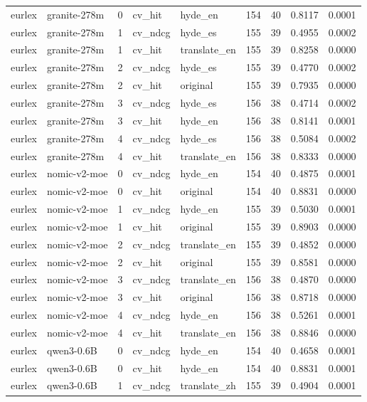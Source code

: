 \begin{tabular}{llrllrrrr}
eurlex & granite-278m & 0 & cv\_hit & hyde\_en & 154 & 40 & 0.8117 & 0.0001 \\
eurlex & granite-278m & 1 & cv\_ndcg & hyde\_es & 155 & 39 & 0.4955 & 0.0002 \\
eurlex & granite-278m & 1 & cv\_hit & translate\_en & 155 & 39 & 0.8258 & 0.0000 \\
eurlex & granite-278m & 2 & cv\_ndcg & hyde\_es & 155 & 39 & 0.4770 & 0.0002 \\
eurlex & granite-278m & 2 & cv\_hit & original & 155 & 39 & 0.7935 & 0.0000 \\
eurlex & granite-278m & 3 & cv\_ndcg & hyde\_es & 156 & 38 & 0.4714 & 0.0002 \\
eurlex & granite-278m & 3 & cv\_hit & hyde\_en & 156 & 38 & 0.8141 & 0.0001 \\
eurlex & granite-278m & 4 & cv\_ndcg & hyde\_es & 156 & 38 & 0.5084 & 0.0002 \\
eurlex & granite-278m & 4 & cv\_hit & translate\_en & 156 & 38 & 0.8333 & 0.0000 \\
eurlex & nomic-v2-moe & 0 & cv\_ndcg & hyde\_en & 154 & 40 & 0.4875 & 0.0001 \\
eurlex & nomic-v2-moe & 0 & cv\_hit & original & 154 & 40 & 0.8831 & 0.0000 \\
eurlex & nomic-v2-moe & 1 & cv\_ndcg & hyde\_en & 155 & 39 & 0.5030 & 0.0001 \\
eurlex & nomic-v2-moe & 1 & cv\_hit & original & 155 & 39 & 0.8903 & 0.0000 \\
eurlex & nomic-v2-moe & 2 & cv\_ndcg & translate\_en & 155 & 39 & 0.4852 & 0.0000 \\
eurlex & nomic-v2-moe & 2 & cv\_hit & original & 155 & 39 & 0.8581 & 0.0000 \\
eurlex & nomic-v2-moe & 3 & cv\_ndcg & translate\_en & 156 & 38 & 0.4870 & 0.0000 \\
eurlex & nomic-v2-moe & 3 & cv\_hit & original & 156 & 38 & 0.8718 & 0.0000 \\
eurlex & nomic-v2-moe & 4 & cv\_ndcg & hyde\_en & 156 & 38 & 0.5261 & 0.0001 \\
eurlex & nomic-v2-moe & 4 & cv\_hit & translate\_en & 156 & 38 & 0.8846 & 0.0000 \\
eurlex & qwen3-0.6B & 0 & cv\_ndcg & hyde\_en & 154 & 40 & 0.4658 & 0.0001 \\
eurlex & qwen3-0.6B & 0 & cv\_hit & hyde\_en & 154 & 40 & 0.8831 & 0.0001 \\
eurlex & qwen3-0.6B & 1 & cv\_ndcg & translate\_zh & 155 & 39 & 0.4904 & 0.0001 \\

\end{tabular}
